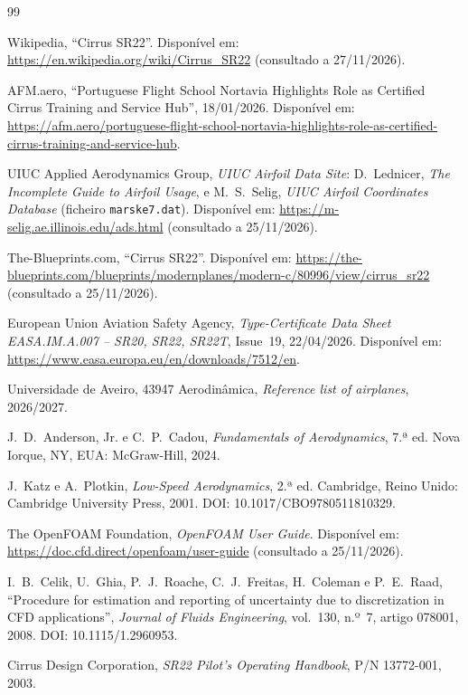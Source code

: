 \begin{thebibliography}{99}

Wikipedia, ``Cirrus SR22''. Disponível em:
\url{https://en.wikipedia.org/wiki/Cirrus_SR22} (consultado a 27/11/2026).

AFM.aero, ``Portuguese Flight School Nortavia Highlights Role as Certified Cirrus
Training and Service Hub'', 18/01/2026. Disponível em:
\url{https://afm.aero/portuguese-flight-school-nortavia-highlights-role-as-certified-cirrus-training-and-service-hub}.

UIUC Applied Aerodynamics Group, \emph{UIUC Airfoil Data Site}: D.~Lednicer,
\emph{The Incomplete Guide to Airfoil Usage}, e M.~S.~Selig, \emph{UIUC Airfoil
Coordinates Database} (ficheiro \texttt{marske7.dat}). Disponível em:
\url{https://m-selig.ae.illinois.edu/ads.html} (consultado a 25/11/2026).

The-Blueprints.com, ``Cirrus SR22''. Disponível em:
\url{https://the-blueprints.com/blueprints/modernplanes/modern-c/80996/view/cirrus_sr22}
(consultado a 25/11/2026).

European Union Aviation Safety Agency, \emph{Type-Certificate Data Sheet
EASA.IM.A.007 -- SR20, SR22, SR22T}, Issue~19, 22/04/2026. Disponível em:
\url{https://www.easa.europa.eu/en/downloads/7512/en}.

Universidade de Aveiro, 43947 Aerodinâmica, \emph{Reference list of airplanes},
2026/2027.

J.~D.~Anderson, Jr. e C.~P.~Cadou, \emph{Fundamentals of Aerodynamics}, 7.ª ed.
Nova Iorque, NY, EUA: McGraw-Hill, 2024.

J.~Katz e A.~Plotkin, \emph{Low-Speed Aerodynamics}, 2.ª ed. Cambridge, Reino
Unido: Cambridge University Press, 2001. DOI: 10.1017/CBO9780511810329.

The OpenFOAM Foundation, \emph{OpenFOAM User Guide}. Disponível em:
\url{https://doc.cfd.direct/openfoam/user-guide} (consultado a 25/11/2026).

I.~B.~Celik, U.~Ghia, P.~J.~Roache, C.~J.~Freitas, H.~Coleman e P.~E.~Raad,
``Procedure for estimation and reporting of uncertainty due to discretization
in CFD applications'', \emph{Journal of Fluids Engineering}, vol.~130,
n.º~7, artigo 078001, 2008. DOI: 10.1115/1.2960953.

Cirrus Design Corporation, \emph{SR22 Pilot's Operating Handbook}, P/N 13772-001, 2003.

\end{thebibliography}
